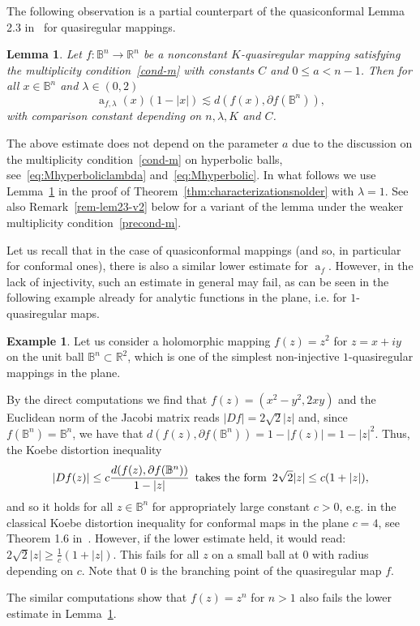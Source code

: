 \documentclass[11pt,a4paper,reqno]{amsart}
\newtheorem{lem}[theorem]{Lemma}
\theoremstyle{definition}
\newtheorem{ex}[theorem]{Example}
\renewcommand{\a}{\operatorname{a}}
\newcommand{\B}{\mathbb{B}^n}
\newcommand{\R}{\mathbb{R}}
\newcommand{\blue}{\color{blau}}
\newcounter{komcounter}
\numberwithin{komcounter}{section}
\newcommand{\komT}[1]{{\bf \blue [\refstepcounter{komcounter}\thekomcounter (by T): #1]}}
\begin{document}
The following observation is a partial counterpart of the quasiconformal Lemma 2.3 in~\cite{ak} for quasiregular mappings.
\begin{lem}\label{lem:2.3AK}
	Let $f:\B\rightarrow\R^n$ be a nonconstant $K$-quasiregular mapping satisfying the multiplicity condition~\eqref{cond-m} with constants $C$ and $0\leq a<n-1$. Then for all $x\in \B$ and $\lambda\in (0,2)$ 
	$$
	 \a_{f,\lambda} (x)(1-|x|) \lesssim d(f(x),\partial f(\B)),
	$$
	with comparison constant depending on $n,\lambda, K$ and $C$.	
\end{lem}

The above estimate does not depend on the parameter $a$ due to the discussion on the multiplicity condition~\eqref{cond-m} on hyperbolic balls, see~\eqref{eq:Mhyperboliclambda} and~\eqref{eq:Mhyperbolic}. In what follows we use Lemma~\ref{lem:2.3AK} in the proof of Theorem~\ref{thm:characterizationsnolder} with $\lambda=1$. See also Remark~\ref{rem-lem23-v2} below for a variant of the lemma under the weaker multiplicity condition~\eqref{precond-m}.

Let us recall that in the case of quasiconformal mappings (and so, in particular for conformal ones), there is also a similar lower estimate for $\a_f$. However, in the lack of injectivity, such an estimate in general may fail, as can be seen in the following example already for analytic functions in the plane, i.e. for $1$-quasiregular maps.

\begin{ex}
Let us consider a holomorphic mapping $f(z)=z^2$ for $z=x+iy$ on the unit ball $\B\subset \R^2$, which is one of the simplest non-injective $1$-quasiregular mappings in the plane. 

By the direct computations we find that $f(z)=(x^2-y^2, 2xy)$ and the Euclidean norm of the Jacobi matrix reads $|Df|=2\sqrt{2}|z|$ and, since $f(\B)=\B$, we have that $d(f(z),\partial f(\B))=1-|f(z)|=1-|z|^2$. Thus, the Koebe distortion inequality
$$ 
 |Df(z)|\leq c \frac{d(f(z),\partial f(\B))}{1-|z|}\, \hbox{ takes the form }\, 2\sqrt{2}|z|\leq c (1+|z|),
$$
 and so it holds for all $z\in \B$ for appropriately large constant $c>0$, e.g. in the classical Koebe distortion inequality for conformal maps in the plane $c=4$, see Theorem 1.6 in~\cite{asge1}. However, if the lower estimate held, it would read: $2\sqrt{2}|z|\geq \frac{1}{c} (1+|z|)$. This fails for all $z$ on a small ball at $0$ with radius depending on $c$. Note that $0$ is the branching point of the quasiregular map $f$.

The similar computations show that $f(z)=z^n$ for $n>1$ also fails the lower estimate in Lemma~\ref{lem:2.3AK}.
\end{ex}
 
\end{document}
